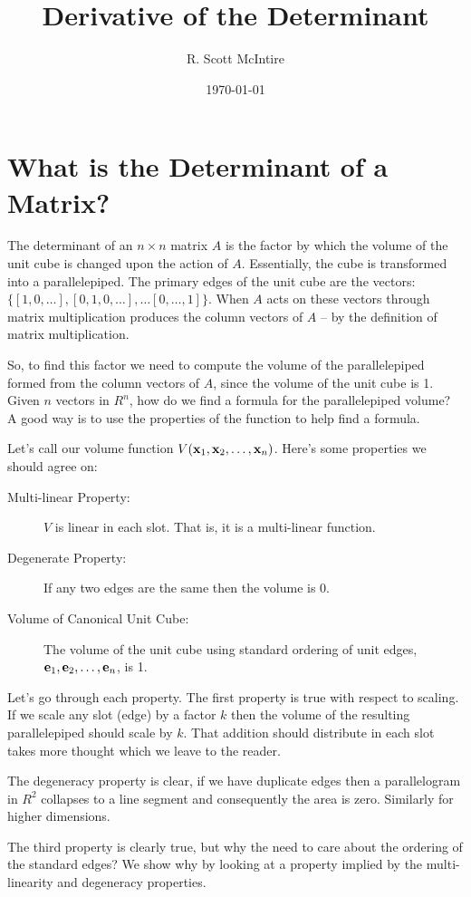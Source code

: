 \documentclass{article}
\title{Derivative of the Determinant}
\author{R. Scott McIntire}
\date{\today}
\begin{document}
\maketitle

\section{What is the Determinant of a Matrix?}
The determinant of an $n\times n$ matrix $A$ is the factor by which the volume of
the unit cube is changed upon the action of $A$. Essentially, the cube is
transformed into a parallelepiped. The primary edges of the unit cube are the
vectors: $\{ [1, 0, \ldots], [0, 1, 0, \ldots], \ldots [0, \dots, 1]\}$.
When $A$ acts on these vectors through matrix multiplication
produces the column vectors of $A$ -- by the definition of matrix multiplication.

So, to find this factor we need to compute the volume of the parallelepiped formed
from the column vectors of $A$, since the volume of the unit cube is 1.
Given $n$ vectors in $R^n$, how do we find a formula for the parallelepiped volume?
A good way is to use the properties of the function to help find a formula.

Let's call our volume function $V({\bf x}_1, {\bf x}_2, \ldots, {\bf x}_n)$.
Here's some properties we should agree on:
\begin{description}
\item[Multi-linear Property:]{$V$ is linear in each slot. That is,
    it is a multi-linear function.}
\item[Degenerate Property:]{If any two edges are the same then the volume is $0$.}
\item[Volume of Canonical Unit Cube:]{The volume of the unit cube using
    standard ordering of unit edges, ${\bf e}_1, {\bf e}_2, \ldots , {\bf e}_n$, is 1.}
\end{description}
Let's go through each property.
The first property is true with respect to scaling. If we scale any slot
(edge) by a factor
$k$ then the volume of the resulting parallelepiped should scale by $k$.
That addition should distribute in each slot takes more thought which we leave
to the reader.

The degeneracy property is clear, if we have duplicate edges then a parallelogram
in $R^2$ collapses to a line segment and consequently the area is zero. Similarly
for higher dimensions.

The third property is clearly true, but why the need to care about the ordering
of the standard edges? We show why by looking at a property implied by the
multi-linearity and degeneracy properties.
    
\end{document}
